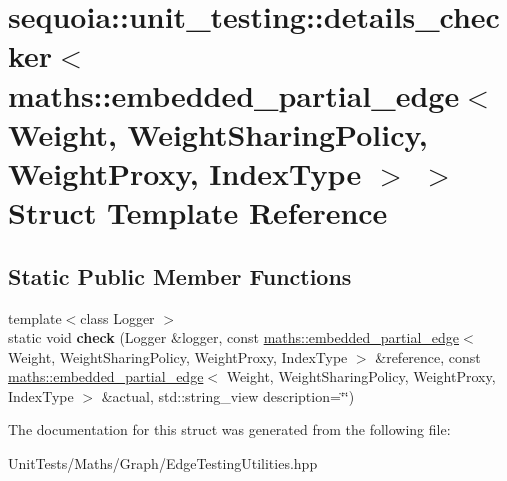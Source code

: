\hypertarget{structsequoia_1_1unit__testing_1_1details__checker_3_01maths_1_1embedded__partial__edge_3_01_wei7b5fe1a620ffbdb05181a47e4a7eda53}{}\section{sequoia\+::unit\+\_\+testing\+::details\+\_\+checker$<$ maths\+::embedded\+\_\+partial\+\_\+edge$<$ Weight, Weight\+Sharing\+Policy, Weight\+Proxy, Index\+Type $>$ $>$ Struct Template Reference}
\label{structsequoia_1_1unit__testing_1_1details__checker_3_01maths_1_1embedded__partial__edge_3_01_wei7b5fe1a620ffbdb05181a47e4a7eda53}
\subsection*{Static Public Member Functions}
\begin{DoxyCompactItemize}
\item 
\mbox{\label{structsequoia_1_1unit__testing_1_1details__checker_3_01maths_1_1embedded__partial__edge_3_01_wei7b5fe1a620ffbdb05181a47e4a7eda53_a99df0ea99f7bc0e5cf070a2fea56919d}} 
{\footnotesize template$<$class Logger $>$ }\\static void {\bfseries check} (Logger \&logger, const \mbox{\hyperlink{classsequoia_1_1maths_1_1embedded__partial__edge}{maths\+::embedded\+\_\+partial\+\_\+edge}}$<$ Weight, Weight\+Sharing\+Policy, Weight\+Proxy, Index\+Type $>$ \&reference, const \mbox{\hyperlink{classsequoia_1_1maths_1_1embedded__partial__edge}{maths\+::embedded\+\_\+partial\+\_\+edge}}$<$ Weight, Weight\+Sharing\+Policy, Weight\+Proxy, Index\+Type $>$ \&actual, std\+::string\+\_\+view description=\char`\"{}\char`\"{})
\end{DoxyCompactItemize}


The documentation for this struct was generated from the following file\+:\begin{DoxyCompactItemize}
\item 
Unit\+Tests/\+Maths/\+Graph/Edge\+Testing\+Utilities.\+hpp\end{DoxyCompactItemize}
